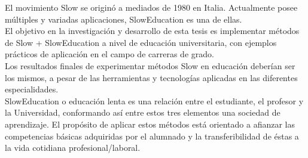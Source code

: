 % 
% 
%
El movimiento Slow se origin\'o a mediados de 1980 en Italia. Actualmente posee m\'ultiples y variadas aplicaciones, SlowEducation es una de ellas.\\
El objetivo en la investigaci\'on y desarrollo de esta tesis es implementar m\'etodos de Slow + SlowEducation a nivel de educaci\'on universitaria, 
con ejemplos pr\'acticos de aplicaci\'on en el campo de carreras de grado.\\
Los resultados finales de experimentar m\'etodos Slow en educaci\'on deber\'ian ser los mismos, a pesar de las herramientas y tecnolog\'ias aplicadas en las
diferentes especialidades.\\
SlowEducation o educaci\'on lenta es una relaci\'on entre el estudiante, el profesor y la Universidad, conformando as\'i entre estos tres elementos una sociedad 
de aprendizaje. El prop\'osito de aplicar estos m\'etodos est\'a orientado a afianzar las competencias b\'asicas adquiridas por el alumnado y la transferibilidad 
de \'estas a la vida cotidiana profesional/laboral.


